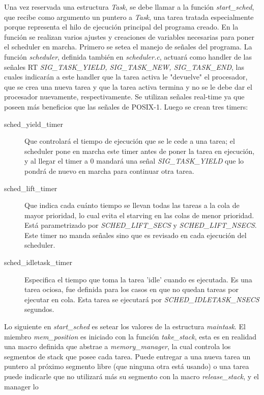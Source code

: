 \documentclass[a4paper]{article}
\begin{document}
Una vez reservada una estructura \textit{Task}, se debe llamar a la
función \textit{start\_sched}, que recibe como argumento un puntero
a \textit{Task}, una tarea tratada especialmente porque representa
el hilo de ejecución principal del programa creado. En la función
se realizan varios ajustes y creaciones de variables necesarias
para poner el scheduler en marcha. Primero se setea el manejo de
señales del programa. La función \textit{scheduler},
definida también en \textit{scheduler.c}, actuará como handler de
las señales RT \textit{SIG\_TASK\_YIELD, SIG\_TASK\_NEW, SIG\_TASK\_END},
las cuales indicarán a este handler que la tarea activa le "devuelve"
el procesador, que se crea una nueva tarea y que la tarea activa
termina y no se le debe dar el procesador nuevamente, respectivamente.
Se utilizan señales real-time ya que poseen más beneficios que las
señales de POSIX-1. Luego se crean tres timers:
\begin{description}
    \item[sched\_yield\_timer]Que controlará el tiempo de ejecución que se
    le cede a una tarea; el scheduler pone en marcha este timer antes
    de poner la tarea en ejecución, y al llegar el timer a 0 mandará
    una señal \textit{SIG\_TASK\_YIELD} que lo pondrá de nuevo en marcha
    para continuar otra tarea.
    \item[sched\_lift\_timer] Que indica cada cu\'anto tiempo se llevan
    todas las tareas a la cola de mayor prioridad, lo cual evita el
    starving en las colas de menor prioridad. Est\'a parametrizado por
    \textit{SCHED\_LIFT\_SECS} y \textit{SCHED\_LIFT\_NSECS}. Este timer
    no manda señales sino que es revisado en cada ejecuci\'on del
    scheduler.
    \item[sched\_idletask\_timer] Especifica el tiempo que toma la tarea
    'idle' cuando es ejecutada. Es una tarea ociosa, fue definida para
    los casos en que no quedan tareas por ejecutar en cola. Esta tarea
    se ejecutar\'a por \textit{SCHED\_IDLETASK\_NSECS} segundos.
\end{description}
Lo siguiente en \textit{start\_sched} es setear los valores de la
estructura \textit{maintask}. El miembro \textit{mem\_position} es
iniciado con la función \textit{take\_stack}, esta es en realidad una
macro definida que abstrae a \textit{memory\_manager},
la cual controla los segmentos de stack que posee cada tarea. Puede
entregar a una nueva tarea un puntero al próximo segmento libre (que
ninguna otra está usando) o una tarea puede indicarle que no utilizará
más su segmento con la macro \textit{release\_stack}, y el manager lo
\end{document}
